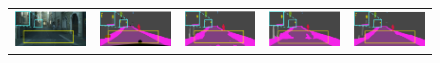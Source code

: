 \documentclass[letterpaper]{article} %
\begin{document}
\begin{figure}[t]
\centering
\setlength{\fboxsep}{0pt}
\begin{tabular}{ccccc}
\includegraphics[width=0.19\linewidth]{image/supp/figure6/1a.png}\label{city_1a} &
\hspace{-12pt}
\includegraphics[width=0.19\linewidth]{image/supp/figure6/1b.png}\label{city_1b} &
\hspace{-12pt}
\includegraphics[width=0.19\linewidth]{image/supp/figure6/1c.png}\label{city_1c} &
\hspace{-12pt}
\includegraphics[width=0.19\linewidth]{image/supp/figure6/1d.png}\label{city_1d} &
\hspace{-12pt}
\includegraphics[width=0.19\linewidth]{image/supp/figure6/1e.png}\label{city_1e} \\


\end{tabular}
\end{figure}
\end{document}
